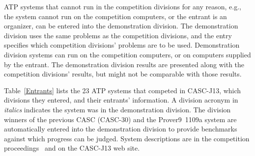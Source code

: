 \documentclass[aic]{iosart2x}
\newcommand{\smalltt}[1]{\small \texttt{#1}}
\newcommand{\LAST}{\mbox{CASC-30}}
\newcommand{\THIS}{\mbox{CASC-J13}}
\newcommand{\NUMBEROFENTRANTS}{\mbox{Twenty three}}
\begin{document}
\begin{table}[htbp]
\begin{tabular}{p{1cm}p{7cm}p{5cm}}
%
%
\end{tabular}
\end{table}

ATP systems that cannot run in the competition divisions for any reason, e.g., the system cannot
run on the competition computers, or the entrant is an organizer, can be entered into the 
demonstration division.
The demonstration division uses the same problems as the competition divisions, and the entry
specifies which competition divisions' problems are to be used.
Demonstration division systems can run on the competition computers, or on computers supplied by 
the entrant.
The demonstration division results are presented along with the competition divisions' results,
but might not be comparable with those results.

Table~\ref{Entrants} lists the 23 
ATP systems that competed in \THIS{}, which divisions they entered, and their entrants' 
information.
A division acronym in {\em italics} indicates the system was in the demonstration division.
The division winners of the previous CASC (\LAST{}) and the Prover9~1109a system are automatically
entered into the demonstration division to provide benchmarks against which progress can be judged.
System descriptions are in the competition proceedings~\cite{Sut26-CASC-J13} and on the \THIS{}
web site.
\end{document}
